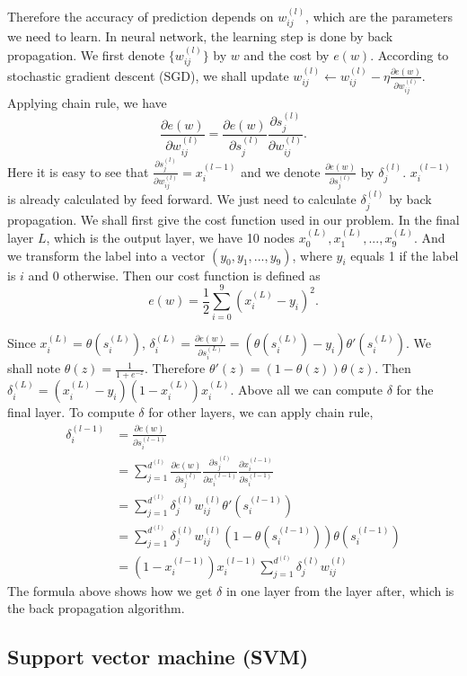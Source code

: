 \documentclass[11pt,letterpaper]{article}
\begin{document}
Therefore the accuracy of prediction depends on $w_{ij}^{(l)}$, which are the parameters we need to learn. In neural network, the learning step is done by back propagation. We first denote $\{w_{ij}^{(l)}\}$ by $w$ and the cost by $e(w)$. According to stochastic gradient descent (SGD), we shall update $w_{ij}^{(l)}\gets w_{ij}^{(l)}-\eta\frac{\partial e(w)}{\partial w_{ij}^{(l)}}$. Applying chain rule, we have
$$\frac{\partial e(w)}{\partial w_{ij}^{(l)}}=\frac{\partial e(w)}{\partial s_j^{(l)}}\frac{\partial s_j^{(l)}}{\partial w_{ij}^{(l)}}.$$
Here it is easy to see that $\frac{\partial s_j^{(l)}}{\partial w_{ij}^{(l)}}=x_i^{(l-1)}$ and we denote $\frac{\partial e(w)}{\partial s_j^{(l)}}$ by $\delta_j^{(l)}$. $x_i^{(l-1)}$ is already calculated by feed forward. We just need to calculate $\delta_j^{(l)}$ by back propagation. We shall first give the cost function used in our problem. In the final layer $L$, which is the output layer, we have 10 nodes $x_0^{(L)},x_1^{(L)},...,x_{9}^{(L)}$. And we transform the label into a vector $(y_0,y_1,...,y_{9})$, where $y_i$ equals 1 if the label is $i$ and 0 otherwise. Then our cost function is defined as 
$$e(w)=\frac{1}{2}\sum_{i=0}^{9}(x_i^{(L)}-y_i)^2.$$

Since $x_i^{(L)}=\theta(s_i^{(L)})$, $\delta_{i}^{(L)}=\frac{\partial e(w)}{\partial s_i^{(L)}}=(\theta(s_i^{(L)})-y_i)\theta'(s_i^{(L)})$. We shall note $\theta(z)=\frac{1}{1+e^{-z}}$. Therefore $\theta'(z)=(1-\theta(z))\theta(z)$. Then $\delta_{i}^{(L)}=(x_i^{(L)}-y_i)(1-x_i^{(L)})x_i^{(L)}$. Above all we can compute $\delta$ for the final layer. To compute $\delta$ for other layers, we can apply chain rule,
\begin{align*}
\delta_i^{(l-1)}&=\frac{\partial e(w)}{\partial s_i^{(l-1)}}\\
&=\sum_{j=1}^{d^{(l)}}\frac{\partial e(w)}{\partial s_j^{(l)}}\frac{\partial s_j^{(l)}}{\partial x_i^{(l-1)}}\frac{\partial x_i^{(l-1)}}{\partial s_i^{(l-1)}}\\
&=\sum_{j=1}^{d^{(l)}}\delta_j^{(l)}w_{ij}^{(l)}\theta'(s_i^{(l-1)})\\
&=\sum_{j=1}^{d^{(l)}}\delta_j^{(l)}w_{ij}^{(l)}(1-\theta(s_i^{(l-1)}))\theta(s_i^{(l-1)})\\
&=(1-x_i^{(l-1)})x_i^{(l-1)}\sum_{j=1}^{d^{(l)}}\delta_j^{(l)}w_{ij}^{(l)}
\end{align*}  
The formula above shows how we get $\delta$ in one layer from the layer after, which is the back propagation algorithm. 

\subsection{Support vector machine (SVM)}
\end{document}
